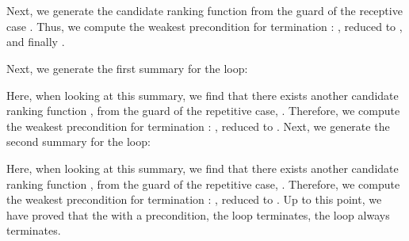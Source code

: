 \documentclass[acmsmall,screen,review,anonymous,nonacm]{acmart}
\begin{document}
{
~\\
\\
}

Next, we generate the candidate ranking function  from the guard of the receptive case . 
Thus, we compute the weakest precondition for termination \wrt {}: 
, reduced to 
, and finally . 

Next, we generate the first summary for the loop: 

\begin{center}
\end{center}

Here, when looking at this summary, we find that there exists another candidate ranking function , from the guard of the repetitive case, \ie  \code{[y{>}0]}. 
Therefore, we compute the weakest precondition for termination \wrt {}:   
, reduced to 
. 
Next, we generate the second summary for the loop: 

\begin{center}
\end{center}

Here, when looking at this summary, we find that there exists another candidate ranking function , from the guard of the repetitive case, \ie  \code{[z{>}1]}. 
Therefore, we compute the weakest precondition for termination \wrt {}:   
, reduced to 
. 
Up to this point, we have proved that the with a  precondition, the loop terminates, \ie  the loop always terminates.  
\end{document}
